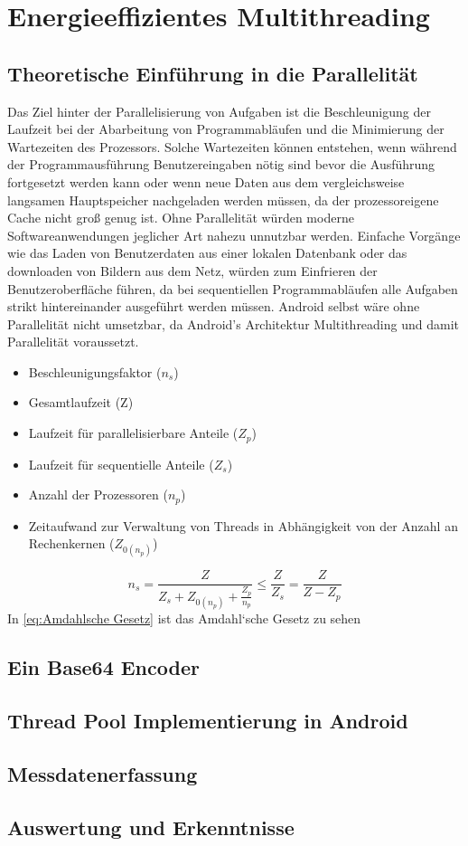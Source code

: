 \chapter{Energieeffizientes Multithreading}
\section{Theoretische Einführung in die Parallelität}
Das Ziel hinter der Parallelisierung von Aufgaben ist die Beschleunigung der Laufzeit bei der Abarbeitung von Programmabläufen und die Minimierung der Wartezeiten des Prozessors. Solche Wartezeiten können entstehen, wenn während der Programmausführung Benutzereingaben nötig sind bevor die Ausführung fortgesetzt werden kann oder wenn neue Daten aus dem vergleichsweise langsamen Hauptspeicher nachgeladen werden müssen, da der prozessoreigene Cache nicht groß genug ist. Ohne Parallelität würden moderne Softwareanwendungen jeglicher Art nahezu unnutzbar werden. Einfache Vorgänge wie das Laden von Benutzerdaten aus einer lokalen Datenbank oder das downloaden von Bildern aus dem Netz, würden zum Einfrieren der Benutzeroberfläche führen, da bei sequentiellen Programmabläufen alle Aufgaben strikt hintereinander ausgeführt werden müssen. Android selbst wäre ohne Parallelität nicht umsetzbar, da Android's Architektur Multithreading und damit Parallelität voraussetzt.
\begin{itemize}
\item Beschleunigungsfaktor ($n_{ s }$)
\item Gesamtlaufzeit (Z)
\item Laufzeit für parallelisierbare Anteile ($Z_{ p }$)
\item Laufzeit für sequentielle Anteile ($Z_{ s }$)
\item Anzahl der Prozessoren ($n_{ p }$)
\item Zeitaufwand zur Verwaltung von Threads in Abhängigkeit
 von der Anzahl an Rechenkernen ($Z_{ 0(n_{ p }) }$)
\end{itemize}
\begin{equation}\label{eq:Amdahlsche Gesetz}
n_{ s }=\frac{ Z }{ Z_{ s } +Z_{ 0(n_{ p }) }+ \frac{ Z_{ p } }{ n_{ p } }} \leq \frac{ Z }{Z_{ s }  } = \frac{ Z }{ Z-Z_{ p } }
\end{equation}
In \autoref{eq:Amdahlsche Gesetz} ist das Amdahl‘sche Gesetz zu sehen

\section{Ein Base64 Encoder}
\section{Thread Pool Implementierung in Android}
\section{Messdatenerfassung}
\section{Auswertung und Erkenntnisse}
